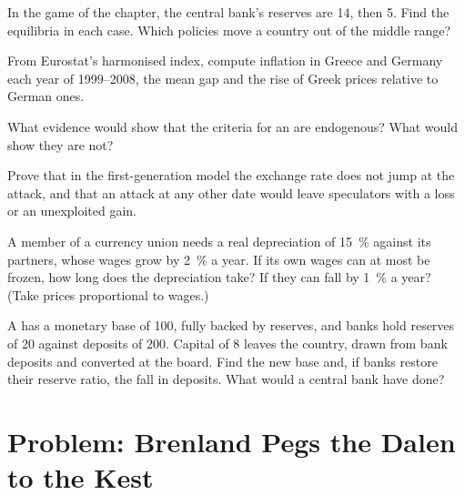\begin{exercise}[$\star\star$]\label{exo:b3:exchange-rate-regimes:7}
In the game of the chapter, the central bank's reserves are 14, then 5. Find the
equilibria in each case. Which policies move a country out of the middle range?
\end{exercise}

\begin{exercise}[$\star\star$]\label{exo:b3:exchange-rate-regimes:8}
From Eurostat's harmonised index, compute inflation in Greece and Germany each year
of 1999--2008, the mean gap and the rise of Greek prices relative to German ones.
\end{exercise}

\begin{exercise}[$\star\star$]\label{exo:b3:exchange-rate-regimes:9}
What evidence would show that the criteria for an  are
endogenous? What would show they are not?
\end{exercise}

\begin{exercise}[$\star\star\star$]\label{exo:b3:exchange-rate-regimes:10}
Prove that in the first-generation model the exchange rate does not jump at the
attack, and that an attack at any other date would leave speculators with a loss
or an unexploited gain.
\end{exercise}

\begin{exercise}[$\star\star\star$]\label{exo:b3:exchange-rate-regimes:11}
A member of a currency union needs a real depreciation of 15~\% against its
partners, whose wages grow by 2~\% a year. If its own wages can at most be frozen,
how long does the depreciation take? If they can fall by 1~\% a year? (Take prices
proportional to wages.)
\end{exercise}

\begin{exercise}[$\star\star\star$]\label{exo:b3:exchange-rate-regimes:12}
A  has a monetary base of 100, fully backed by reserves, and banks
hold reserves of 20 against deposits of 200. Capital of 8 leaves the country, drawn
from bank deposits and converted at the board. Find the new base and, if banks
restore their reserve ratio, the fall in deposits. What would a central bank have
done?
\end{exercise}

\section{Problem: Brenland Pegs the Dalen to the Kest}\label{sec:b3:exchange-rate-regimes:problem}

